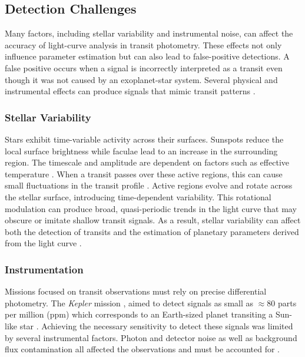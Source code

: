 \subsection{Detection Challenges} \label{sec:Detection_Challenges}

Many factors, including stellar variability and instrumental noise, can affect the accuracy of light-curve analysis in transit photometry. These effects not only influence parameter estimation but can also lead to false-positive detections. A false positive occurs when a signal is incorrectly interpreted as a transit even though it was not caused by an exoplanet-star system. Several physical and instrumental effects can produce signals that mimic transit patterns \citep{Morton_2016}.

\subsubsection{Stellar Variability}

Stars exhibit time-variable activity across their surfaces. Sunspots reduce the local surface brightness while faculae lead to an increase in the surrounding region. The timescale and amplitude are dependent on factors such as effective temperature \citep{2012IAUS..285..364M}. When a transit passes over these active regions, this can cause small fluctuations in the transit profile \citep{2013A&A...556A..19O}. Active regions evolve and rotate across the stellar surface, introducing time-dependent variability. This rotational modulation can produce broad, quasi-periodic trends in the light curve that may obscure or imitate shallow transit signals. As a result, stellar variability can affect both the detection of transits and the estimation of planetary parameters derived from the light curve \citep{Bonomo_2009}.

\subsubsection{Instrumentation} 

Missions focused on transit observations must rely on precise differential photometry. The \textit{Kepler} mission \citep{2016RPPh...79c6901B}, aimed to detect signals as small as $\approx80$ parts per million (ppm) which corresponds to an Earth-sized planet transiting a Sun-like star \citep{2010ApJ...713L..92C}. Achieving the necessary sensitivity to detect these signals was limited by several instrumental factors. Photon and detector noise as well as background flux contamination all affected the observations and must be accounted for \citep{2011ApJS..197....6G}. 

